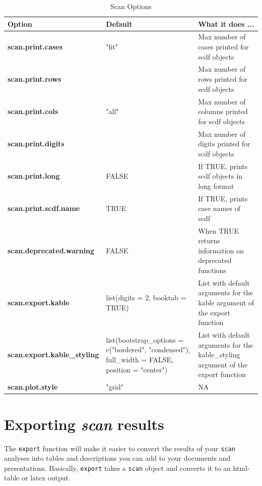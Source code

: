 \documentclass[
]{book}
\begin{document}
\begin{table}

\caption{\label{tab:table-options}Scan Options}
\centering
\begin{tabular}[t]{>{\raggedright\arraybackslash}p{15em}>{\raggedright\arraybackslash}p{15em}l}
\toprule
Option & Default & What it does ...\\
\midrule
\textbf{scan.print.cases} & "fit" & Max number of cases printed for scdf objects\\
\textbf{scan.print.rows} & 15 & Max number of rows printed for scdf objects\\
\textbf{scan.print.cols} & "all" & Max number of columns printed for scdf objects\\
\textbf{scan.print.digits} & 1 & Max number of digits printed for scdf objects\\
\textbf{scan.print.long} & FALSE & If TRUE, prints scdf objects in long format\\
\addlinespace
\textbf{scan.print.scdf.name} & TRUE & If TRUE, prints case names of scdf\\
\textbf{scan.deprecated.warning} & FALSE & When TRUE returns information on deprecated functions\\
\textbf{scan.export.kable} & list(digits = 2, booktab = TRUE) & List with default arguments for the kable argument of the export function\\
\textbf{scan.export.kable\_styling} & list(bootstrap\_options = c("bordered", "condensed"), full\_width = FALSE, position = "center") & List with default arguments for the kable\_styling argument of the export function\\
\textbf{scan.plot.style} & "grid" & NA\\
\bottomrule
\end{tabular}
\end{table}

\hypertarget{exporting-scan-results}{%
\chapter{\texorpdfstring{Exporting \emph{scan} results}{Exporting scan results}}\label{exporting-scan-results}}

The \texttt{export} function will make it easier to convert the results of your \texttt{scan} analyses into tables and descriptions you can add to your documents and presentations. Basically, \texttt{export} takes a \texttt{scan} object and converts it to an html-table or latex output.
\end{document}
